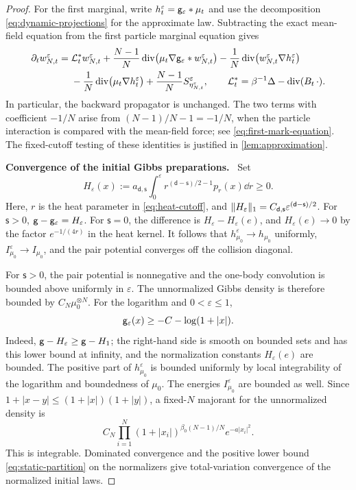 \documentclass[11pt,reqno]{amsart}
\numberwithin{equation}{section}
\theoremstyle{plain}
\theoremstyle{remark}
\DeclarePairedDelimiter{\norm}{\lVert}{\rVert}
\renewcommand{\d}{\mathsf{d}}\newcommand{\s}{\mathsf{s}}
\DeclareMathOperator{\diver}{div}
\newcommand{\parheading}[1]{\par\medskip\noindent\textbf{#1}\ }
\begin{document}
\begin{proof}
For the first marginal, write $h_t^\varepsilon=\mathsf g_\varepsilon*\mu_t$ and use the decomposition \eqref{eq:dynamic-projections} for the approximate law. Subtracting the exact mean-field equation from the first particle marginal equation gives
\begin{align}
 \partial_tw_{N,t}^\varepsilon={}&\mathcal L_t^*w_{N,t}^\varepsilon
 +\frac{N-1}{N}\diver\bigl(\mu_t\nabla\g_\varepsilon*w_{N,t}^\varepsilon\bigr)
 -\frac1N\diver\bigl(w_{N,t}^\varepsilon\nabla h_t^\varepsilon\bigr)\notag\\
 &-\frac1N\diver\bigl(\mu_t\nabla h_t^\varepsilon\bigr)
 +\frac{N-1}{N}S^\varepsilon_{\eta_{N,t}^\varepsilon},
 \qquad \mathcal L_t^*=\beta^{-1}\Delta-\diver(B_t\,\cdot).
 \label{eq:fixed-background-first-marginal}
\end{align}
In particular, the backward propagator is unchanged. The two terms with coefficient $-1/N$ arise from $(N-1)/N-1=-1/N$, when the particle interaction is compared with the mean-field force; see \eqref{eq:first-mark-equation}. The fixed-cutoff testing of these identities is justified in \cref{lem:approximation}.

\parheading{Convergence of the initial Gibbs preparations.}
Set
\begin{equation}\label{eq:fixed-background-short-potential}
 H_\varepsilon(x):=a_{\d,\s}\int_0^\varepsilon r^{(\d-\s)/2-1}p_r(x)\dd r\ge0.
\end{equation}
Here, $r$ is the heat parameter in \eqref{eq:heat-cutoff}, and $\norm{H_\varepsilon}_1=C_{\d,\s}\varepsilon^{(\d-\s)/2}$. For $\s>0$, $\mathsf g-\mathsf g_\varepsilon=H_\varepsilon$. For $\s=0$, the difference is $H_\varepsilon-H_\varepsilon(e)$, and $H_\varepsilon(e)\to0$ by the factor $e^{-1/(4r)}$ in the heat kernel. It follows that $h_{\mu_0}^\varepsilon\to h_{\mu_0}$ uniformly, $I_{\mu_0}^\varepsilon\to I_{\mu_0}$, and the pair potential converges off the collision diagonal.

For $\s>0$, the pair potential is nonnegative and the one-body convolution is bounded above uniformly in $\varepsilon$. The unnormalized Gibbs density is therefore bounded by $C_N\mu_0^{\otimes N}$. For the logarithm and $0<\varepsilon\le1$,
\begin{equation}\label{eq:fixed-background-log-lower}
 \mathsf g_\varepsilon(x)\ge-C-\log(1+|x|).
\end{equation}
Indeed, $\mathsf g-H_\varepsilon\ge\mathsf g-H_1$; the right-hand side is smooth on bounded sets and has this lower bound at infinity, and the normalization constants $H_\varepsilon(e)$ are bounded. The positive part of $h_{\mu_0}^\varepsilon$ is bounded uniformly by local integrability of the logarithm and boundedness of $\mu_0$. The energies $I_{\mu_0}^\varepsilon$ are bounded as well. Since $1+|x-y|\le(1+|x|)(1+|y|)$, a fixed-$N$ majorant for the unnormalized density is
\begin{equation}\label{eq:fixed-background-gibbs-majorant}
 C_N\prod_{i=1}^N(1+|x_i|)^{\beta_0(N-1)/N}e^{-a|x_i|^2}.
\end{equation}
This is integrable. Dominated convergence and the positive lower bound \eqref{eq:static-partition} on the normalizers give total-variation convergence of the normalized initial laws.
\end{proof}
\end{document}
